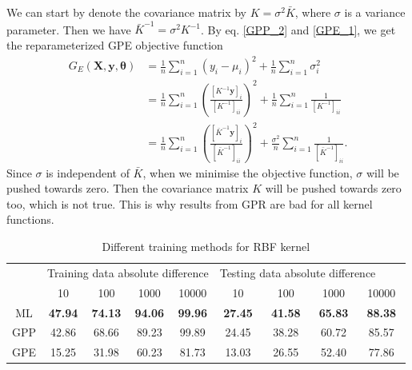 \documentclass[11pt,a4paper]{article}
\theoremstyle{definition}
\numberwithin{equation}{section}
\let\vec\mathbf
\begin{document}
	We can start by denote the covariance matrix by $K = \sigma^2 \bar K$, where $\sigma$ is a variance parameter. Then we have $\bar K^{-1} = \sigma^2 K^{-1} $. By eq. \ref{GPP_2} and \ref{GPE_1}, we get the reparameterized GPE objective function
	\begin{equation}\label{reparameterized_GPE}
	\begin{split}
	G_E(\vec X,\vec y, \vec \theta) &= \frac{1}{n}\sum_{i=1}^{n}(y_i-\mu_i)^2+\frac{1}{n}\sum_{i=1}^{n}\sigma^2_i\\
	& = \frac{1}{n}\sum_{i=1}^{n}\left(\frac{[K^{-1}\vec y]_i}{[K^{-1}]_{ii}}\right)^2+\frac{1}{n}\sum_{i=1}^{n}\frac{1}{[K^{-1}]_{ii}}\\
	& = \frac{1}{n}\sum_{i=1}^{n}\left(\frac{[\bar K^{-1}\vec y]_i}{[\bar K^{-1}]_{ii}}\right)^2+\frac{\sigma^2}{n}\sum_{i=1}^{n}\frac{1}{[\bar K^{-1}]_{ii}}.
	\end{split}
	\end{equation}
	Since $\sigma$ is independent of $\bar K$, when we minimise the objective function, $\sigma$ will be pushed towards zero. Then the covariance matrix $K$ will be pushed towards zero too, which is not true\cite{Sundararajan_Keerthi}. This is why results from GPR are bad for all kernel functions.
	
	\begin{table}
		\centering
		\begin{tabular}{c|cccc|cccc} 
			\toprule
			& \multicolumn{4}{l|}{Training data absolute difference}            & \multicolumn{4}{l}{Testing data absolute difference~ ~ ~}          \\
			& 10             & 100            & 1000           & 10000          & 10             & 100            & 1000           & 10000           \\ 
			\hline\hline
			ML  & \textbf{47.94} & \textbf{74.13} & \textbf{94.06} & \textbf{99.96} & \textbf{27.45} & \textbf{41.58} & \textbf{65.83} & \textbf{88.38}  \\
			GPP & 42.86          & 68.66          & 89.23          & 99.89          & 24.45          & 38.28          & 60.72          & 85.57           \\
			GPE & 15.25          & 31.98          & 60.23          & 81.73          & 13.03          & 26.55          & 52.40          & 77.86           \\
			\bottomrule
		\end{tabular}
		\caption{Different training methods  for RBF kernel}
		\label{multitrain_rbf}
	\end{table}
	
\end{document}
